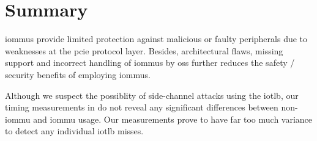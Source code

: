 \section{Summary}
\label{sec:sec_summary}

\acp{iommu} provide limited protection against malicious or faulty peripherals
due to weaknesses at the \ac{pcie} protocol layer. Besides, architectural flaws,
missing support and incorrect handling of \acp{iommu} by \aclp{os} further
reduces the safety / security benefits of employing \acp{iommu}.

Although we suspect the possiblity of side-channel attacks using the \ac{iotlb},
our timing measurements in  do not reveal any significant
differences between non-\ac{iommu} and \ac{iommu} usage. Our measurements prove
to have far too much variance to detect any individual \ac{iotlb} misses.

